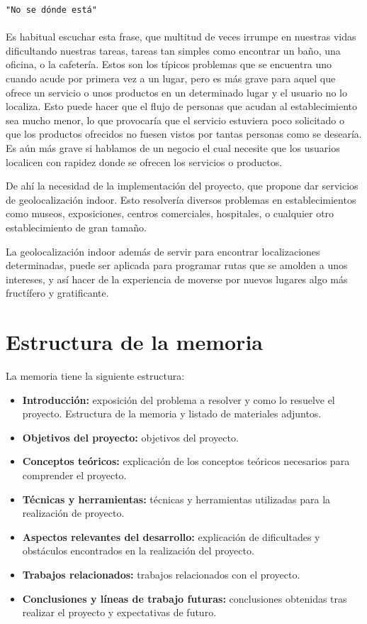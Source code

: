 
\texttt{"No se dónde está"}\\
\\
Es habitual escuchar esta frase, que multitud de veces irrumpe en nuestras vidas dificultando nuestras tareas, tareas
tan simples como encontrar un baño, una oficina, o la cafetería. Estos son los típicos problemas que se encuentra uno 
cuando acude por primera vez a un lugar, pero es más grave para aquel que ofrece un servicio o unos productos en un 
determinado lugar y el usuario no lo localiza. Esto puede hacer que el flujo de personas que acudan al establecimiento 
sea mucho menor, lo que provocaría que el servicio estuviera poco solicitado o que los productos ofrecidos no fuesen vistos 
por tantas personas como se desearía. Es aún más grave si hablamos de un negocio el cual necesite que los usuarios localicen
con rapidez donde se ofrecen los servicios o productos. 
 
De ahí la necesidad de la implementación del proyecto, que propone dar servicios de geolocalización indoor. Esto resolvería 
diversos problemas en establecimientos como museos, exposiciones, centros comerciales, hospitales,
o cualquier otro establecimiento de gran tamaño.

La geolocalización indoor además de servir para encontrar localizaciones determinadas, puede ser aplicada para programar 
rutas que se amolden a unos intereses, y así hacer de la experiencia de moverse por nuevos lugares algo más fructífero y gratificante.

\section{Estructura de la memoria}\label{estructura-de-la-memoria}

La memoria tiene la siguiente estructura:

\begin{itemize}
\tightlist
\item
  \textbf{Introducción:} exposición del problema a resolver y como lo resuelve el proyecto.
   Estructura de la memoria y listado de materiales
  adjuntos.
\item
  \textbf{Objetivos del proyecto:} objetivos del proyecto.
\item
  \textbf{Conceptos teóricos:} explicación de los conceptos teóricos necesarios para comprender el proyecto.
\item
  \textbf{Técnicas y herramientas:} técnicas y herramientas utilizadas para la realización de proyecto.
\item
  \textbf{Aspectos relevantes del desarrollo:} explicación de dificultades y obstáculos encontrados en la realización del proyecto.
\item
  \textbf{Trabajos relacionados:} trabajos relacionados con el proyecto.
\item
  \textbf{Conclusiones y líneas de trabajo futuras:} conclusiones
  obtenidas tras realizar el proyecto y expectativas de futuro.
\end{itemize}

